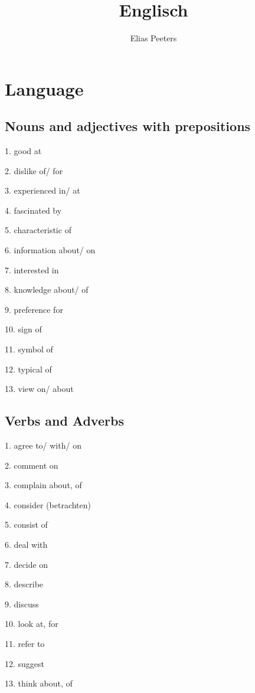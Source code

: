 \documentclass[11pt, oneside]{article}
\title{Englisch}
\author{Elias Peeters}
\begin{document}
\maketitle

\pagebreak

\tableofcontents

\pagebreak

\section{Language}

\subsection{Nouns and adjectives with prepositions}

1. good at

2. dislike of/ for

3. experienced in/ at

4. fascinated by

5. characteristic of

6. information about/ on

7. interested in

8. knowledge about/ of

9. preference for

10. sign of

11. symbol of

12. typical of

13. view on/ about

\pagebreak

\subsection{Verbs and Adverbs}

1. agree to/ with/ on

2. comment on

3. complain about, of

4. consider (betrachten)

5. consist of

6. deal with 

7. decide on

8. describe

9. discuss

10. look at, for

11. refer to

12. suggest

13. think about, of
\end{document}
